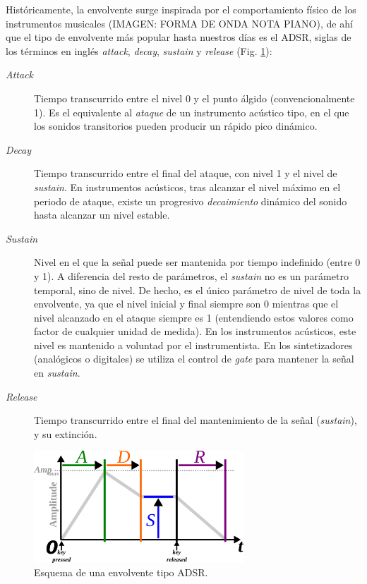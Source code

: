 Históricamente, la envolvente surge inspirada por el comportamiento físico de los instrumentos musicales (IMAGEN: FORMA DE ONDA NOTA PIANO), de ahí que el tipo de envolvente más popular hasta nuestros días es el ADSR, siglas de los términos en inglés \textit{attack}, \textit{decay}, \textit{sustain} y \textit{release} (Fig. \ref{fig:adsr}):
\begin{description}
	\item[\textit{Attack}] Tiempo transcurrido entre el nivel 0 y el punto álgido (convencionalmente 1). Es el equivalente al \textit{ataque} de un instrumento acústico tipo, en el que los sonidos transitorios pueden producir un rápido pico dinámico.
	\item[\textit{Decay}] Tiempo transcurrido entre el final del ataque, con nivel 1 y el nivel de \textit{sustain}. En instrumentos acústicos, tras alcanzar el nivel máximo en el periodo de ataque, existe un progresivo \textit{decaimiento} dinámico del sonido hasta alcanzar un nivel estable.
	\item[\textit{Sustain}] Nivel en el que la señal puede ser mantenida por tiempo indefinido (entre 0 y 1). A diferencia del resto de parámetros, el \textit{sustain} no es un parámetro temporal, sino de nivel. De hecho, es el único parámetro de nivel de toda la envolvente, ya que el nivel inicial y final siempre son 0 mientras que el nivel alcanzado en el ataque siempre es 1 (entendiendo estos valores como factor de cualquier unidad de medida). En los instrumentos acústicos, este nivel es mantenido a voluntad por el instrumentista. En los sintetizadores (analógicos o digitales) se utiliza el control de \textit{gate} para mantener la señal en \textit{sustain}.
	\item[\textit{Release}] Tiempo transcurrido entre el final del mantenimiento de la señal (\textit{sustain}), y su extinción. 
\end{description} 

\begin{figure}
	\centering
	\includegraphics[width=0.7\textwidth]{env_ADSR}
	\caption{Esquema de una envolvente tipo ADSR.}
	\label{fig:adsr}
\end{figure}

